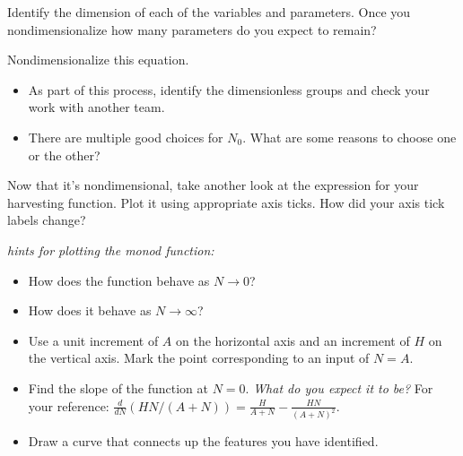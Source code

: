 \documentclass[12pt,letterpaper,noanswers]{exam}
\begin{document}
\begin{questions}
\begin{parts}
\item Identify the dimension of each of the variables and parameters.  Once you nondimensionalize
how many parameters do you expect to remain?
\item Nondimensionalize this equation.  
\begin{itemize}
    \item As part of this process, identify the dimensionless groups and check your work with another team.
    \item There are multiple good choices for $N_0$.  What are some
reasons to choose one or the other?
\end{itemize}
\item Now that it's nondimensional, take another look at the expression for your harvesting function.  Plot it using appropriate axis ticks.  How did your axis tick labels change?
\end{parts}

\emph{hints for plotting the monod function:}

\begin{itemize}
    \item How does the function behave as $N\rightarrow 0$?  
    \item How does it behave as $N \rightarrow \infty$?
    \item Use a unit increment of $A$ on the horizontal axis and an increment of $H$ on the vertical axis.  Mark the point corresponding to an input of $N = A$.
    \item Find the slope of the function at $N = 0$.  \emph{What do you expect it to be?}  For your reference: $\displaystyle\frac{d}{dN}(H N/(A+N)) = \frac{H}{A+N}-\frac{HN}{(A+N)^2}.$
    \item Draw a curve that connects up the features you have identified.
\end{itemize}
\end{questions}
\end{document}
